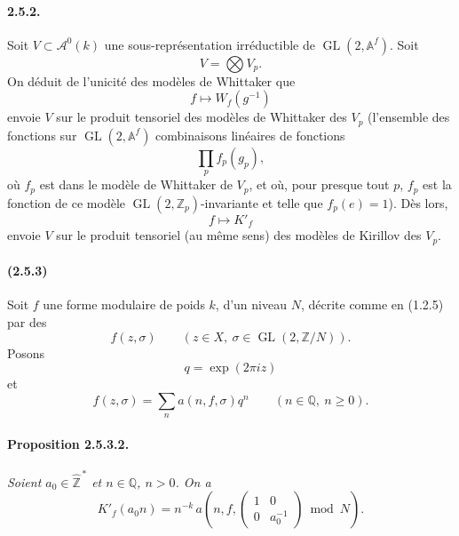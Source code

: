 \documentclass[10pt,a4paper]{article}
\providecommand{\GL}{\operatorname{GL}}
\providecommand{\Q}{\mathbb Q}
\providecommand{\Z}{\mathbb Z}
\providecommand{\Af}{\mathbb A^f}
\begin{document}
\paragraph{2.5.2.} Soit \(V\subset \mathcal A^0(k)\) une sous-représentation irréductible de \(\GL(2,\Af)\). Soit
\[
V=\bigotimes V_p.
\]
On déduit de l'unicité des modèles de Whittaker que
\[
f\longmapsto W_f(g^{-1})
\]
envoie \(V\) sur le produit tensoriel des modèles de Whittaker des \(V_p\) (l'ensemble des fonctions sur \(\GL(2,\Af)\) combinaisons linéaires de fonctions
\[
\prod_p f_p(g_p),
\]
où \(f_p\) est dans le modèle de Whittaker de \(V_p\), et où, pour presque tout \(p\), \(f_p\) est la fonction de ce modèle \(\GL(2,\Z_p)\)-invariante et telle que \(f_p(e)=1\)). Dès lors,
\[
f\longmapsto K'_f
\]
envoie \(V\) sur le produit tensoriel (au même sens) des modèles de Kirillov des \(V_p\).

\paragraph{(2.5.3)} Soit \(f\) une forme modulaire de poids \(k\), d'un niveau \(N\), décrite comme en (1.2.5) par des
\[
f(z,\sigma)\qquad
(z\in X,\ \sigma\in\GL(2,\Z/N)).
\]
Posons
\[
q=\exp(2\pi iz)
\]
et
\[
\tag{2.5.3.1}
f(z,\sigma)=\sum_n a(n,f,\sigma)q^n
\qquad(n\in\Q,\ n\ge0).
\]

\clearpage
{}
\hypertarget{authority-35}{}
\paragraph{Proposition 2.5.3.2.}{\itshape  Soient \(a_0\in\widehat{\Z}^{\,*}\) et \(n\in\Q\), \(n>0\). On a
\[
K'_f(a_0n)
=
n^{-k}\,
a\!\left(n,f,\begin{pmatrix}1&0\\0&a_0^{-1}\end{pmatrix}\bmod N\right).
\]\par}
\end{document}
